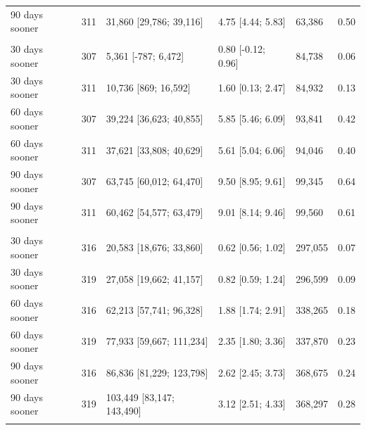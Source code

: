 \documentclass{article}
\begin{document}
\begin{table}
\begin{tabular}[t]{lrlllr}
\hspace{1em}90 days sooner & 311 & 31,860 [29,786; 39,116] & 4.75 [4.44; 5.83] & 63,386 & 0.50\\
\addlinespace[0.3em]
\multicolumn{6}{l}{\textbf{UK to Jan 2022}}\\
\hspace{1em}30 days sooner & 307 & 5,361 [-787; 6,472] & 0.80 [-0.12; 0.96] & 84,738 & 0.06\\
\hspace{1em}30 days sooner & 311 & 10,736 [869; 16,592] & 1.60 [0.13; 2.47] & 84,932 & 0.13\\
\hspace{1em}60 days sooner & 307 & 39,224 [36,623; 40,855] & 5.85 [5.46; 6.09] & 93,841 & 0.42\\
\hspace{1em}60 days sooner & 311 & 37,621 [33,808; 40,629] & 5.61 [5.04; 6.06] & 94,046 & 0.40\\
\hspace{1em}90 days sooner & 307 & 63,745 [60,012; 64,470] & 9.50 [8.95; 9.61] & 99,345 & 0.64\\
\hspace{1em}90 days sooner & 311 & 60,462 [54,577; 63,479] & 9.01 [8.14; 9.46] & 99,560 & 0.61\\
\addlinespace[0.3em]
\multicolumn{6}{l}{\textbf{US to April 2021}}\\
\hspace{1em}30 days sooner & 316 & 20,583 [18,676; 33,860] & 0.62 [0.56; 1.02] & 297,055 & 0.07\\
\hspace{1em}30 days sooner & 319 & 27,058 [19,662; 41,157] & 0.82 [0.59; 1.24] & 296,599 & 0.09\\
\hspace{1em}60 days sooner & 316 & 62,213 [57,741; 96,328] & 1.88 [1.74; 2.91] & 338,265 & 0.18\\
\hspace{1em}60 days sooner & 319 & 77,933 [59,667; 111,234] & 2.35 [1.80; 3.36] & 337,870 & 0.23\\
\hspace{1em}90 days sooner & 316 & 86,836 [81,229; 123,798] & 2.62 [2.45; 3.73] & 368,675 & 0.24\\
\hspace{1em}90 days sooner & 319 & 103,449 [83,147; 143,490] & 3.12 [2.51; 4.33] & 368,297 & 0.28\\
\addlinespace[0.3em]
\multicolumn{6}{l}{\textbf{US to July 2021}}\\

\end{tabular}
\end{table}
\end{document}
